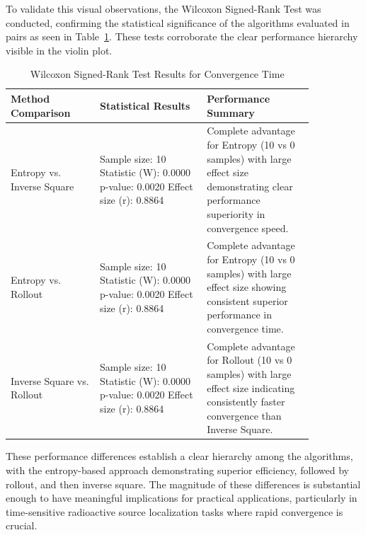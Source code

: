 \documentclass[../report.tex]{subfiles}
\begin{document}
    To validate this visual observations, the Wilcoxon Signed-Rank Test was conducted, confirming the statistical significance of the algorithms evaluated in pairs as seen 
    in Table~\ref{tab:wilcoxon_results}. These tests corroborate the clear performance hierarchy visible in the violin plot.
    \begin{table}[ht]
        \caption{Wilcoxon Signed-Rank Test Results for Convergence Time}
        \label{tab:wilcoxon_results}
        \centering
        \begin{tabular}{|p{0.25\linewidth}|p{0.3\linewidth}|p{0.3\linewidth}|}
            \hline
            \rowcolor{gray!10} 
            Method Comparison & Statistical Results & Performance Summary \\
            \hline
            Entropy vs. Inverse Square & 
            Sample size: 10 \newline
            Statistic (W): 0.0000 \newline
            p-value: 0.0020 \newline
            Effect size (r): 0.8864 & 
            Complete advantage for Entropy (10 vs 0 samples) with large effect size demonstrating clear performance superiority in convergence speed. \\
            \hline
            Entropy vs. Rollout & 
            Sample size: 10 \newline
            Statistic (W): 0.0000 \newline
            p-value: 0.0020 \newline
            Effect size (r): 0.8864 & 
            Complete advantage for Entropy (10 vs 0 samples) with large effect size showing consistent superior performance in convergence time. \\
            \hline
            Inverse Square vs. Rollout & 
            Sample size: 10 \newline
            Statistic (W): 0.0000 \newline
            p-value: 0.0020 \newline
            Effect size (r): 0.8864 & 
            Complete advantage for Rollout (10 vs 0 samples) with large effect size indicating consistently faster convergence than Inverse Square. \\
        \hline
        \end{tabular}
    \end{table}

    These performance differences establish a clear hierarchy among the algorithms, with the entropy-based approach demonstrating superior efficiency, followed by 
    rollout, and then inverse square. The magnitude of these differences is substantial enough to have meaningful implications for practical applications, 
    particularly in time-sensitive radioactive source localization tasks where rapid convergence is crucial.
\end{document}
